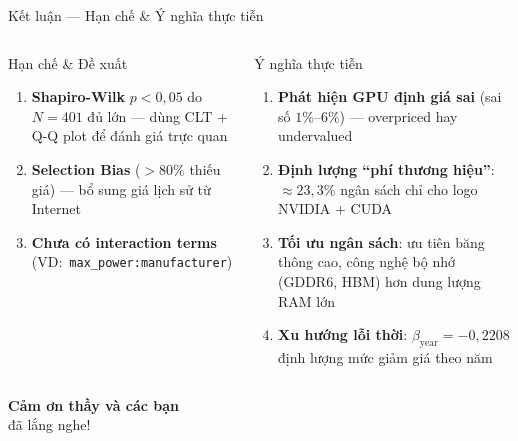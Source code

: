 \documentclass[13pt, aspectratio=169]{beamer}
\begin{document}
\begin{frame}{Kết luận --- Hạn chế \& Ý nghĩa thực tiễn}
  \begin{columns}[T]
      \begin{alertblock}{Hạn chế \& Đề xuất}
        \footnotesize
        \begin{enumerate}
          \item \textbf{Shapiro-Wilk} $p < 0{,}05$ do $N=401$ đủ lớn --- dùng CLT + Q-Q plot để đánh giá trực quan
          \item \textbf{Selection Bias} ($>80\%$ thiếu giá) --- bổ sung giá lịch sử từ Internet
          \item \textbf{Chưa có interaction terms} (VD:\ \texttt{max\_power:manufacturer})
        \end{enumerate}
      \end{alertblock}
      \begin{exampleblock}{Ý nghĩa thực tiễn}
        \footnotesize
        \begin{enumerate}
          \item \textbf{Phát hiện GPU định giá sai} (sai số $1\%$--$6\%$) --- overpriced hay undervalued
          \item \textbf{Định lượng ``phí thương hiệu''}: $\approx 23{,}3\%$ ngân sách chỉ cho logo NVIDIA + CUDA
          \item \textbf{Tối ưu ngân sách}: ưu tiên băng thông cao, công nghệ bộ nhớ (GDDR6, HBM) hơn dung lượng RAM lớn
          \item \textbf{Xu hướng lỗi thời}: $\beta_{\text{year}} = -0{,}2208$ định lượng mức giảm giá theo năm
        \end{enumerate}
      \end{exampleblock}
  \end{columns}
\end{frame}

\begin{frame}[plain]
  \centering
  \vspace{1.2em}
  {\Huge \textbf{Cảm ơn thầy và các bạn}}\\[0.7em]
  {\large đã lắng nghe!}\\[0.8em]
\end{frame}
\end{document}
